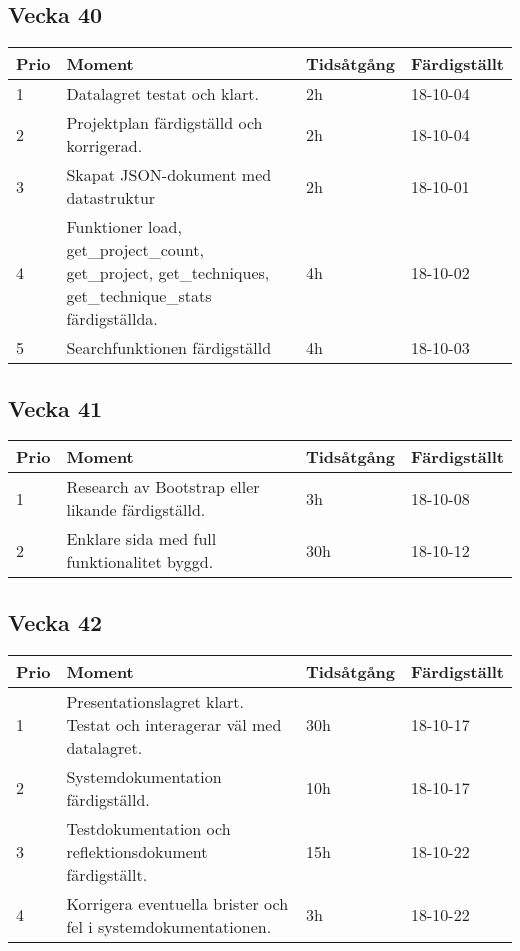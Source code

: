 \documentclass{TDP003mall}
\begin{document}
\subsection{Vecka 40}
\begin{table}[!h]
\begin{tabularx}{\linewidth}{|l|X|l|l|}\hline
\textbf{Prio} & \textbf{Moment} & \textbf{Tidsåtgång} & \textbf{Färdigställt}\\\hline
1& Datalagret testat och klart. & 2h & 18-10-04 \\\hline
2& Projektplan färdigställd och korrigerad. & 2h & 18-10-04 \\\hline
3& Skapat JSON-dokument med datastruktur & 2h & 18-10-01 \\\hline
4& Funktioner load, get\_project\_count, get\_project, get\_techniques, get\_technique\_stats färdigställda. & 4h & 18-10-02 \\\hline
5& Searchfunktionen färdigställd & 4h & 18-10-03 \\\hline
\end{tabularx}
\end{table}

\subsection{Vecka 41}
\begin{table}[!h]
\begin{tabularx}{\linewidth}{|l|X|l|l|}\hline
\textbf{Prio} & \textbf{Moment} & \textbf{Tidsåtgång} & \textbf{Färdigställt}\\\hline
1& Research av Bootstrap eller likande färdigställd. & 3h & 18-10-08 \\\hline
2& Enklare sida med full funktionalitet byggd. & 30h & 18-10-12 \\\hline
\end{tabularx}
\end{table}

\subsection{Vecka 42}
\begin{table}[!h]
\begin{tabularx}{\linewidth}{|l|X|l|l|}
\hline
\textbf{Prio} & \textbf{Moment} & \textbf{Tidsåtgång} & \textbf{Färdigställt}\\\hline
1& Presentationslagret klart. Testat och interagerar väl med datalagret. & 30h & 18-10-17 \\\hline
2& Systemdokumentation färdigställd. &10h & 18-10-17 \\\hline
3& Testdokumentation och reflektionsdokument färdigställt. & 15h & 18-10-22 \\\hline
4& Korrigera eventuella brister och fel i systemdokumentationen. & 3h & 18-10-22 \\\hline
\end{tabularx}
\end{table}
\end{document}
